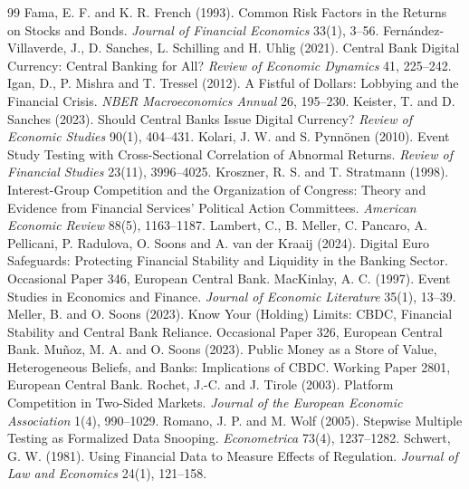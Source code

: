 \documentclass[11pt]{article}
\theoremstyle{plain}\newtheorem{proposition}{Proposition}
\begin{document}
\begin{thebibliography}{99}
 Fama, E. F. and K. R. French (1993). Common Risk Factors in the Returns on Stocks and Bonds. \emph{Journal of Financial Economics} 33(1), 3--56.
 Fern\'andez-Villaverde, J., D. Sanches, L. Schilling and H. Uhlig (2021). Central Bank Digital Currency: Central Banking for All? \emph{Review of Economic Dynamics} 41, 225--242.
 Igan, D., P. Mishra and T. Tressel (2012). A Fistful of Dollars: Lobbying and the Financial Crisis. \emph{NBER Macroeconomics Annual} 26, 195--230.
 Keister, T. and D. Sanches (2023). Should Central Banks Issue Digital Currency? \emph{Review of Economic Studies} 90(1), 404--431.
 Kolari, J. W. and S. Pynn\"onen (2010). Event Study Testing with Cross-Sectional Correlation of Abnormal Returns. \emph{Review of Financial Studies} 23(11), 3996--4025.
 Kroszner, R. S. and T. Stratmann (1998). Interest-Group Competition and the Organization of Congress: Theory and Evidence from Financial Services' Political Action Committees. \emph{American Economic Review} 88(5), 1163--1187.
 Lambert, C., B. Meller, C. Pancaro, A. Pellicani, P. Radulova, O. Soons and A. van der Kraaij (2024). Digital Euro Safeguards: Protecting Financial Stability and Liquidity in the Banking Sector. Occasional Paper 346, European Central Bank.
 MacKinlay, A. C. (1997). Event Studies in Economics and Finance. \emph{Journal of Economic Literature} 35(1), 13--39.
 Meller, B. and O. Soons (2023). Know Your (Holding) Limits: CBDC, Financial Stability and Central Bank Reliance. Occasional Paper 326, European Central Bank.
 Mu\~noz, M. A. and O. Soons (2023). Public Money as a Store of Value, Heterogeneous Beliefs, and Banks: Implications of CBDC. Working Paper 2801, European Central Bank.
 Rochet, J.-C. and J. Tirole (2003). Platform Competition in Two-Sided Markets. \emph{Journal of the European Economic Association} 1(4), 990--1029.
 Romano, J. P. and M. Wolf (2005). Stepwise Multiple Testing as Formalized Data Snooping. \emph{Econometrica} 73(4), 1237--1282.
 Schwert, G. W. (1981). Using Financial Data to Measure Effects of Regulation. \emph{Journal of Law and Economics} 24(1), 121--158.
\end{thebibliography}
\end{document}
